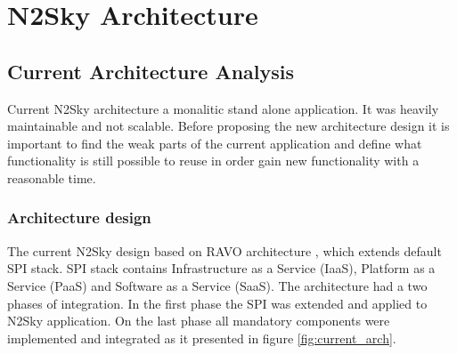 \section{N2Sky Architecture}\label{TheN2SkyArchitecture}

\subsection{Current Architecture Analysis}\label{CurrentArchitectureAnalysis}

Current N2Sky architecture a monalitic stand alone application. It was heavily maintainable and not scalable. Before proposing the new architecture design it is important to find the weak parts of the current application and define what functionality is still possible to reuse in order gain new functionality with a reasonable time.  

\subsubsection{Architecture design}\label{Architecturedesign}

The current N2Sky design based on RAVO architecture \cite{ravo}, which extends default SPI stack. SPI stack contains Infrastructure as a Service (IaaS), Platform as a Service (PaaS) and Software as a Service (SaaS). The architecture had a two phases of integration.  In the first phase the SPI was extended and applied to N2Sky application. On the last phase all mandatory components were implemented and integrated as it presented in figure \ref{fig:current_arch}.


